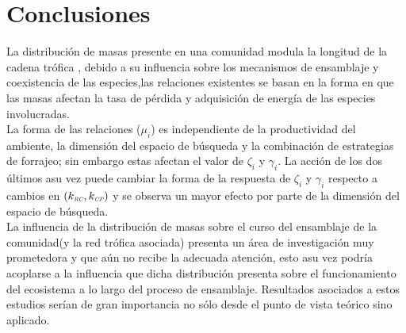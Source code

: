 \section{Conclusiones}

La distribuci\'on de masas presente en una comunidad modula la longitud de la cadena tr\'ofica , debido a su influencia sobre los mecanismos de ensamblaje y coexistencia de las especies,las relaciones existentes se basan en la forma en que las masas afectan la tasa de p\'erdida y adquisici\'on de energ\'ia de las especies involucradas.\\
La forma de las relaciones ($\mu_i$) es independiente de la productividad del ambiente, la dimensi\'on del espacio de b\'usqueda y la combinaci\'on de estrategias de forrajeo; sin embargo estas afectan el valor de $\zeta_i$ y $\gamma_i$. La acci\'on de los dos \'ultimos asu vez puede cambiar la forma de la respuesta de $\zeta_i$ y $\gamma_i$ respecto a cambios en $(k_{\textit{\tiny RC}},k_{\textit{\tiny CP}})$ y se observa un mayor efecto por parte de la dimensi\'on del espacio de b\'usqueda.\\
La influencia de la distribuci\'on de masas sobre el curso del ensamblaje de la comunidad(y la red tr\'ofica asociada) presenta un \'area de investigaci\'on muy prometedora y que a\'un no recibe la adecuada atenci\'on, esto asu vez podr\'ia acoplarse a la influencia que dicha distribuci\'on presenta sobre el funcionamiento del ecosistema a lo largo del proceso de ensamblaje. Resultados asociados a estos estudios ser\'ian de gran importancia no s\'olo desde el punto de vista te\'orico sino aplicado.






